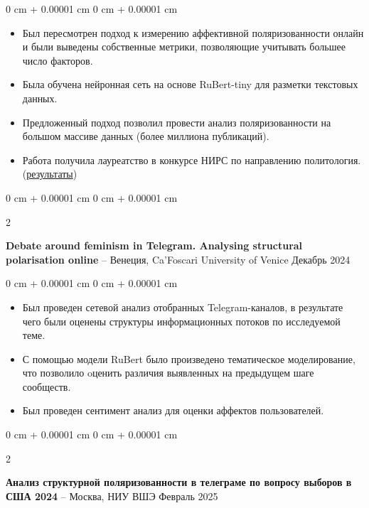 \documentclass[10pt, letterpaper]{article}
\newenvironment{highlights}{
    \begin{itemize}[
        topsep=0.10 cm,
        parsep=0.10 cm,
        partopsep=0pt,
        itemsep=0pt,
        leftmargin=0 cm + 10pt
    ]
}{
    \end{itemize}
} %
\newenvironment{onecolentry}{
    \begin{adjustwidth}{
        0 cm + 0.00001 cm
    }{
        0 cm + 0.00001 cm
    }
}{
    \end{adjustwidth}
} %
\newenvironment{twocolentry}[2][]{
    \onecolentry
    \def\secondColumn{#2}
    \setcolumnwidth{\fill, 4.5 cm}
    \begin{paracol}{2}
}{
    \switchcolumn \raggedleft \secondColumn
    \end{paracol}
    \endonecolentry
} %
\begin{document}
        \vspace{0.10 cm}
        \begin{onecolentry}
            \begin{highlights}
                \item Был пересмотрен подход к измерению аффективной поляризованности онлайн и были выведены собственные метрики, позволяющие учитывать большее число факторов.
                \item Была обучена нейронная сеть на основе RuBert-tiny для разметки текстовых данных. 
                \item Предложенный подход позволил провести анализ поляризованности на большом массиве данных (более миллиона публикаций).
                \item Работа получила лауреатство в конкурсе НИРС по направлению политология. (\href{https://www.hse.ru/nirs/nirs2024_results?ysclid=m82zlkb56l414299801}{результаты})
            \end{highlights}
        \end{onecolentry}



        \vspace{0.2 cm}

        \begin{twocolentry}{
            Декабрь 2024
        }
            \textbf{Debate around feminism in Telegram. Analysing structural polarisation online} -- Венеция, Ca'Foscari University of Venice\end{twocolentry}

        \vspace{0.10 cm}
        \begin{onecolentry}
            \begin{highlights}
                \item Был проведен сетевой анализ отобранных Telegram-каналов, в результате чего были оценены структуры информационных потоков по исследуемой теме.
                \item С помощью модели RuBert было произведено тематическое моделирование, что позволило oценить различия выявленных на предыдущем шаге сообществ. 
                \item Был проведен сентимент анализ для оценки аффектов пользователей.
            \end{highlights}
        \end{onecolentry}
        \vspace{0.2 cm}
                \begin{twocolentry}{
            Февраль 2025
        }
            \textbf{Анализ структурной поляризованности в телеграме по вопросу выборов в США 2024} -- Москва, НИУ ВШЭ\end{twocolentry}
\end{document}
